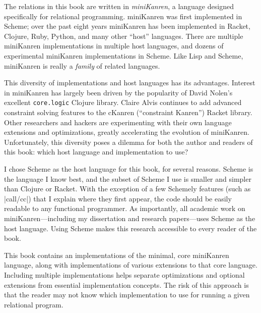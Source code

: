 The relations in this book are written in \emph{miniKanren}, a language
designed specifically for relational programming.
%
miniKanren was first implemented in Scheme; over the past eight years
miniKanren has been implemented in Racket,
 Clojure, Ruby, Python,
and many other ``host'' languages.
%
There are multiple miniKanren implementations in multiple host
languages, and dozens of experimental miniKanren
implementations in Scheme.
%
Like Lisp and Scheme, miniKanren is really a \emph{family} of related
languages.
%

This diversity of implementations and host languages has its advantages.
%
Interest in miniKanren has largely been driven by the popularity of
David Nolen's excellent {\tt core.logic} Clojure library.
%
Claire Alvis continues to add advanced constraint solving features to the
cKanren
(``constraint Kanren'') Racket library.
%
Other researchers and hackers are experimenting with their own
language extensions and optimizations, greatly accelerating the
evolution of miniKanren.
%
Unfortunately, this diversity poses a dilemma for both the author
and readers of this book: which host language and implementation to
use?

\newpage

I chose Scheme as the host language for this book, for several reasons.
%
Scheme is the language I know best, and the subset of Scheme I
use is 
smaller and simpler than Clojure or Racket.
%
With the exception of a few Schemely features (such as
\scheme|call/cc|) that I explain where they first appear, the code
should be easily readable to any functional programmer.
%
As importantly, all academic work on miniKanren---including my
dissertation and research papers---uses Scheme as the host language.
%
Using Scheme makes this research accessible to every reader of the
book.

This book contains an implementations of the minimal, core miniKanren
language, along with implementations of various extensions to that
core language.
%
Including multiple implementations helps separate optimizations and
optional extensions from essential implementation concepts.
%
The risk of this approach is that the reader may not know which
implementation to use for running a given relational program.
%


